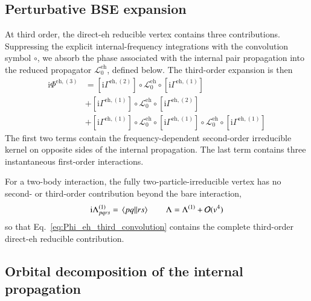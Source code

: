 \documentclass[aip,jcp,reprint,noshowkeys,superscriptaddress]{revtex4-1}
\newcommand{\ii}{\mathrm{i}}
\newcommand{\eh}{\text{eh}}
\begin{document}
\subsection{Perturbative BSE expansion}

At third order, the direct-$\eh$ reducible vertex contains three
contributions.
Suppressing the explicit internal-frequency integrations with the convolution
symbol $\circ$, we absorb the phase associated with the internal pair
propagation into the reduced propagator $\mathcal L_0^\eh$, defined below.
The third-order expansion is then
\begin{equation}
    \begin{split}
    \ii\Phi^{\eh,(3)}
    & =
    \left[\ii\Gamma^{\eh,(2)}\right]
    \circ\mathcal L_0^\eh
    \circ\left[\ii\Gamma^{\eh,(1)}\right]
    \\
    &+
    \left[\ii\Gamma^{\eh,(1)}\right]
    \circ\mathcal L_0^\eh
    \circ\left[\ii\Gamma^{\eh,(2)}\right]
    \\
    &+
    \left[\ii\Gamma^{\eh,(1)}\right]
    \circ\mathcal L_0^\eh
    \circ\left[\ii\Gamma^{\eh,(1)}\right]
    \circ\mathcal L_0^\eh
    \circ\left[\ii\Gamma^{\eh,(1)}\right]
    \end{split}
    \label{eq:Phi_eh_third_convolution}
\end{equation}
The first two terms contain the frequency-dependent second-order irreducible
kernel on opposite sides of the internal propagation.
The last term contains three instantaneous first-order interactions.

For a two-body interaction, the fully two-particle-irreducible vertex has no
second- or third-order contribution beyond the bare interaction,
\begin{equation}
    \ii\Lambda^{(1)}_{pqrs}
    =
    \mel{pq}{}{rs}
    \qquad
    \Lambda
    =
    \Lambda^{(1)}+\mathcal O(v^4)
    \label{eq:Lambda_through_third}
\end{equation}
so that Eq.~\eqref{eq:Phi_eh_third_convolution} contains the complete
third-order direct-$\eh$ reducible contribution.

\subsection{Orbital decomposition of the internal propagation}
\end{document}
